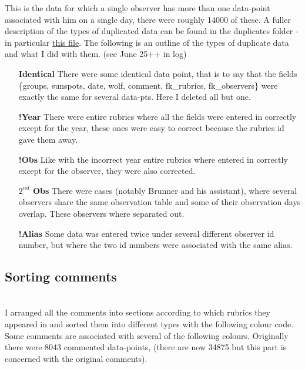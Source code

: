 \documentclass[12pt]{article}
\begin{document}
This is the data for which a single observer has more than one data-point associated with him on a single day, there were roughly 14000 of these. A fuller description of the types of duplicated data can be found in the duplicates folder - in particular \href{https://github.com/dcxSt/DATA_SILSO_HISTO_search/blob/master/duplicates/3\%202019.06.27/corrections_needed_handwritten.md}{this file}. The following is an outline of the types of duplicate data and what I did with them. (see June 25++ in log)

\begin{itemize}
    \item[\textbf{Identical}] There were some identical data point, that is to say that the fields \{groups, sunspots, date, wolf, comment, fk\_rubrics, fk\_observers\} were exactly the same for several data-pts. Here I deleted all but one.
    \item[\textbf{!Year}] There were entire rubrics where all the fields were entered in correctly except for the year, these ones were easy to correct because the rubrics id gave them away.
    \item[\textbf{!Obs}] Like with the incorrect year entire rubrics where entered in correctly except for the observer, they were also corrected.
    \item[\textbf{$2^{nd}$ Obs}] There were cases (notably Brunner and his assistant), where several observers share the same observation table and some of their observation days overlap. These observers where separated out. 
    \item[\textbf{!Alias}] Some data was entered twice under several different observer id number, but where the two id numbers were associated with the same alias.
\end{itemize}


\subsection{Sorting comments}\\

I arranged all the comments into sections according to which rubrics they appeared in and sorted them into different types with the following colour code. Some comments are associated with several of the following colours. Originally there were 8043 commented data-points, (there are now 34875 but this part is concerned with the original comments).
\end{document}
